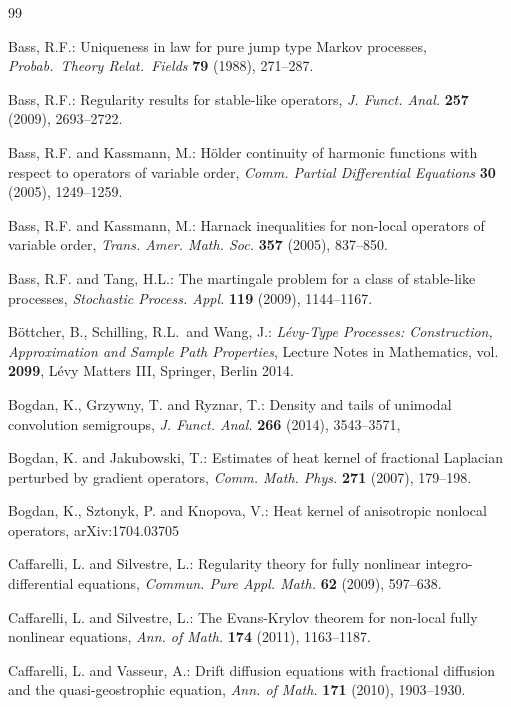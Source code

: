 \documentclass[a4paper,11pt]{amsart}
\theoremstyle{definition}
\begin{document}
\medskip



\begin{thebibliography}{99}

Bass, R.F.: Uniqueness in law for pure jump type Markov processes,
\emph{Probab.\ Theory Relat.\ Fields} \textbf{79}
(1988), 271--287.

 Bass, R.F.:
Regularity results for stable-like operators, \emph{J. Funct. Anal.} \textbf{257} (2009), 2693--2722.

 Bass, R.F. and  Kassmann, M.:
H\"older continuity of harmonic functions with respect to operators of variable order,
\emph{Comm. Partial Differential Equations} \textbf{30} (2005), 1249--1259.

 Bass, R.F. and Kassmann, M.:
Harnack inequalities for non-local operators of variable order, \emph{Trans. Amer. Math. Soc.}
\textbf{357} (2005), 837--850.

 Bass, R.F. and Tang, H.L.: The martingale problem for a class of stable-like processes,
 \emph{Stochastic Process. Appl.} \textbf{119} (2009), 1144--1167.

B\"{o}ttcher, B., Schilling, R.L.\ and Wang, J.: \emph{L\'{e}vy-Type Processes: Construction, Approximation and Sample Path Properties}, Lecture Notes in Mathematics, vol. \textbf{2099}, L\'{e}vy Matters III, Springer,  Berlin 2014.

 Bogdan, K., Grzywny, T. and Ryznar, T.: Density and tails of unimodal convolution
semigroups, \emph{J. Funct. Anal.} \textbf{266} (2014), 3543--3571,



 Bogdan, K. and Jakubowski, T.:
Estimates of heat kernel of fractional Laplacian perturbed by gradient operators, \emph{Comm. Math. Phys.}
\textbf{271} (2007), 179--198.


 Bogdan, K., Sztonyk, P. and Knopova, V.:
Heat kernel of anisotropic nonlocal operators, arXiv:1704.03705

 Caffarelli, L. and Silvestre, L.: Regularity theory for fully nonlinear integro-differential equations,
\emph{Commun. Pure Appl. Math.} \textbf{62} (2009), 597--638.

 Caffarelli, L. and Silvestre, L.: The Evans-Krylov theorem for non-local fully nonlinear equations,
\emph{Ann. of Math.} \textbf{174} (2011), 1163--1187.

  Caffarelli, L. and Vasseur, A.: Drift diffusion equations with fractional diffusion and the
quasi-geostrophic equation, \emph{Ann. of Math.} \textbf{171} (2010), 1903--1930.


\end{thebibliography}
\end{document}
